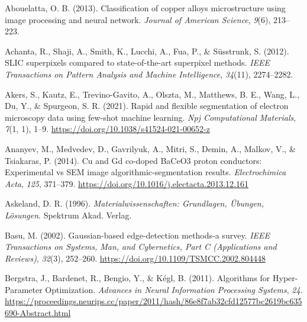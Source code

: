 \documentclass[
  12pt,
  openany]{book}
\newlength{\cslhangindent}
\newlength{\cslentryspacingunit} %
\newenvironment{CSLReferences}[2] %
 {%
  \setlength{\parindent}{0pt}
  \ifodd #1
  \let\oldpar\par
  \def\par{\hangindent=\cslhangindent\oldpar}
  \fi
  \setlength{\parskip}{#2\cslentryspacingunit}
 }%
 {}
\begin{document}
\hypertarget{refs}{}
\begin{CSLReferences}{1}{0}
\leavevmode{}%
Abouelatta, O. B. (2013). Classification of copper alloys microstructure using image processing and neural network. \emph{Journal of American Science}, \emph{9}(6), 213--223.

\leavevmode{}%
Achanta, R., Shaji, A., Smith, K., Lucchi, A., Fua, P., \& Süsstrunk, S. (2012). {SLIC} superpixels compared to state-of-the-art superpixel methods. \emph{IEEE Transactions on Pattern Analysis and Machine Intelligence}, \emph{34}(11), 2274--2282.

\leavevmode{}%
Akers, S., Kautz, E., Trevino-Gavito, A., Olszta, M., Matthews, B. E., Wang, L., Du, Y., \& Spurgeon, S. R. (2021). Rapid and flexible segmentation of electron microscopy data using few-shot machine learning. \emph{Npj Computational Materials}, \emph{7}(1, 1), 1--9. \url{https://doi.org/10.1038/s41524-021-00652-z}

\leavevmode{}%
Ananyev, M., Medvedev, D., Gavrilyuk, A., Mitri, S., Demin, A., Malkov, V., \& Tsiakaras, P. (2014). Cu and {Gd} co-doped {BaCeO3} proton conductors: {Experimental} vs {SEM} image algorithmic-segmentation results. \emph{Electrochimica Acta}, \emph{125}, 371--379. \url{https://doi.org/10.1016/j.electacta.2013.12.161}

\leavevmode{}%
Askeland, D. R. (1996). \emph{Materialwissenschaften: {Grundlagen}, {Übungen}, {Lösungen}}. {Spektrum Akad. Verlag}.

\leavevmode{}%
Basu, M. (2002). Gaussian-based edge-detection methods-a survey. \emph{IEEE Transactions on Systems, Man, and Cybernetics, Part C (Applications and Reviews)}, \emph{32}(3), 252--260. \url{https://doi.org/10.1109/TSMCC.2002.804448}

\leavevmode{}%
Bergstra, J., Bardenet, R., Bengio, Y., \& Kégl, B. (2011). Algorithms for {Hyper-Parameter Optimization}. \emph{Advances in {Neural Information Processing Systems}}, \emph{24}. \url{https://proceedings.neurips.cc/paper/2011/hash/86e8f7ab32cfd12577bc2619bc635690-Abstract.html}


\end{CSLReferences}
\end{document}
